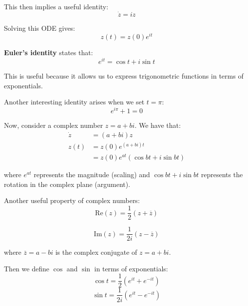 This then implies a useful identity:
\begin{equation*}
\boxed{
    \dot z = i z
}
\end{equation*}

Solving this ODE gives:
\begin{equation*}
z(t) = z(0) e^{i t}
\end{equation*}

\textbf{Euler's identity} states that:
\begin{equation*}
\boxed{
    e^{i t} = \cos t + i \sin t
}
\end{equation*}

This is useful because it allows us to express trigonometric functions in terms of exponentials.

Another interesting identity arises when we set $t = \pi$:
\begin{equation*}
    e^{i \pi} + 1 = 0
\end{equation*}

Now, consider a complex number $z = a + bi$. We have that:
\begin{align*}
\dot z &= (a+bi) z \\
z(t) &= z(0) e^{(a+bi)t} \\
&= z(0) e^{at} (\cos bt + i \sin bt)
\end{align*}

where $e^{at}$ represents the magnitude (scaling) and $\cos bt + i \sin bt$ represents the rotation in the complex plane (argument).

Another useful property of complex numbers:
\begin{equation*}
\boxed{
    \text{Re}(z) = \frac{1}{2} (z + \overline{z}) 
}
\end{equation*}

\begin{equation*}
\boxed{
    \text{Im}(z) = \frac{1}{2i} (z - \overline{z})
}
\end{equation*}

where $\overline{z} = a - bi$ is the complex conjugate of $z = a + bi$.

Then we define $\cos$ and $\sin$ in terms of exponentials:
\begin{equation*}
\boxed{
    \cos t = \frac{1}{2}\left( e^{i t} + e^{-i t} \right)
}
\end{equation*}
\begin{equation*}
\boxed{
    \sin t = \frac{1}{2i} \left( e^{i t} - e^{-i t} \right)
}
\end{equation*}


